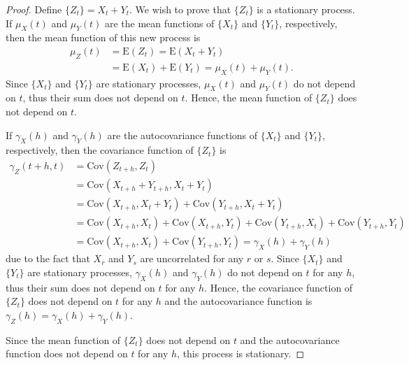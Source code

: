 \documentclass[12pt]{article}
\theoremstyle{definition}
\newcommand{\E}{\text{E}}
\newcommand{\Co}[2]{\text{Cov}({#1}, {#2})}
\begin{document}
\begin{proof}
  Define $\{Z_t\} = {X_t} + {Y_t}$. We wish to prove that $\{Z_t\}$ is a
  stationary process.   If $\mu_X(t)$ and $\mu_Y(t)$ are the mean functions of $\{ X_t \}$ and $\{ Y_t \}$,
  respectively, then the mean function of this new process is
  \begin{align*}
    \mu_Z(t) &= \E(Z_t) = \E(X_t + Y_t) \\
    &= \E(X_t) + \E(Y_t) = \mu_X(t) + \mu_Y(t).
  \end{align*}
  Since $\{ X_t \}$ and $\{ Y_t \}$ are stationary processes, $\mu_X(t)$ and $\mu_Y(t)$ do
  not depend on $t$, thus their sum does not depend on $t$. Hence, the mean
  function of $\{Z_t\}$ does not depend on $t$.

  If $\gamma_X(h)$ and $\gamma_Y(h)$ are the autocovariance functions of $\{ X_t \}$ and $\{ Y_t \}$,
  respectively, then the covariance function of $\{ Z_t \}$ is
  \begin{align*}
    \gamma_Z(t+h, t) &= \Co{Z_{t+h}}{Z_t} \\
    &= \Co{X_{t+h} + Y_{t+h}}{X_{t} + Y_{t}} \\
    &= \Co{X_{t+h}}{X_{t} + Y_{t}} + \Co{Y_{t+h}}{X_{t} + Y_{t}} \\
    &= \Co{X_{t+h}}{X_t} + \Co{X_{t+h}}{Y_t} + \Co{Y_{t+h}}{X_t} + \Co{Y_{t+h}}{Y_t} \\
    &= \Co{X_{t+h}}{X_t} + \Co{Y_{t+h}}{Y_t} = \gamma_X(h) + \gamma_Y(h)
  \end{align*}
  due to the fact that $X_r$ and $Y_s$ are uncorrelated for any $r$ or $s$. Since
  $\{ X_t \}$ and $\{ Y_t \}$ are stationary processes, $\gamma_X(h)$ and $\gamma_Y(h)$ do
  not depend on $t$ for any $h$, thus their sum does not depend on $t$ for any $h$. Hence, the covariance
  function of $\{Z_t\}$ does not depend on $t$ for any $h$ and the autocovariance
  function is $\gamma_Z(h) = \gamma_X(h) + \gamma_Y(h)$.

  Since the mean function of $\{Z_t\}$ does not depend on $t$ and the autocovariance
  function does not depend on $t$ for any $h$, this process is stationary.
\end{proof}
\end{document}
